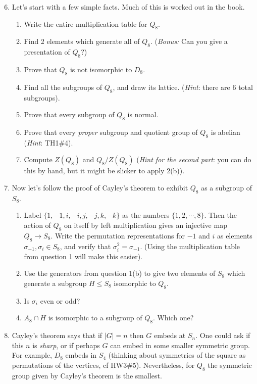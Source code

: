 \documentclass[11pt]{article}
\begin{document}
\begin{enumerate}
  \setcounter{enumi}{5}
  \item Let's start with a few simple facts.  Much of this is worked out in the book.
  \begin{enumerate}
    \item Write the entire multiplication table for $Q_8$.
    \item Find 2 elements which generate all of $Q_8$.  (\textit{Bonus:} Can you give a presentation of $Q_8$?)
    \item Prove that $Q_8$ is not isomorphic to $D_8$.
    \item Find all the subgroups of $Q_8$, and draw its lattice.  (\textit{Hint}: there are 6 total subgroups).
    \item Prove that every subgroup of $Q_8$ is normal.
    \item Prove that every \textit{proper} subgroup and quotient group of $Q_8$ is abelian (\textit{Hint}: TH1\#4).
    \item Compute $Z(Q_8)$ and $Q_8/Z(Q_8)$ (\textit{Hint for the second part}: you can do this by hand, but it might be slicker to apply 2(b)).
  \end{enumerate}
  \item Now let's follow the proof of Cayley's theorem to exhibit $Q_8$ as a subgroup of $S_8$.
  \begin{enumerate}
    \item Label $\{1,-1,i,-i,j,-j,k,-k\}$ as the numbers $\{1,2,\cdots,8\}$. Then the action of $Q_8$ on itself by left multiplication gives an injective map $Q_8\to S_8$.  Write the permutation representations for $-1$ and $i$ as elements $\sigma_{-1},\sigma_i\in S_8$, and verify that $\sigma_i^2 = \sigma_{-1}$.  (Using the multiplication table from question 1 will make this easier).
    \item Use the generators from question 1(b) to give two elements of $S_8$ which generate a subgroup $H\le S_8$ isomorphic to $Q_8$.
    \item Is $\sigma_i$ even or odd?
    \item $A_8\cap H$ is isomorphic to a subgroup of $Q_8$.  Which one?
  \end{enumerate}
  \item Cayley's theorem says that if $|G|=n$ then $G$ embeds at $S_n$.  One could ask if this $n$ is \textit{sharp}, or if perhaps $G$ can embed in some smaller symmetric group.  For example, $D_8$ embeds in $S_4$ (thinking about symmetries of the square as permutations of the vertices, cf HW3\#5).  Nevertheless, for $Q_8$ the symmetric group given by Cayley's theorem is the smallest.

\end{enumerate}
\end{document}
